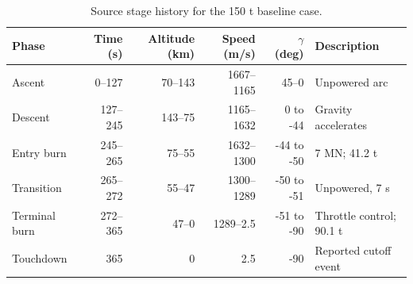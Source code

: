\begin{table}[htbp]
\caption{Source stage history for the 150 t baseline case.}
\label{tab:src6}
\small
\setlength{\tabcolsep}{3.5pt}
\begin{tabularx}{\linewidth}{@{}p{.16\linewidth}rrrrX@{}}
\toprule
Phase & Time (s) & Altitude (km) & Speed (m/s) & $\gamma$ (deg) & Description \\
\midrule
Ascent & 0--127 & 70--143 & 1667--1165 & 45--0 & Unpowered arc \\
Descent & 127--245 & 143--75 & 1165--1632 & 0 to -44 & Gravity accelerates \\
Entry burn & 245--265 & 75--55 & 1632--1300 & -44 to -50 & 7 MN; 41.2 t \\
Transition & 265--272 & 55--47 & 1300--1289 & -50 to -51 & Unpowered, 7 s \\
Terminal burn & 272--365 & 47--0 & 1289--2.5 & -51 to -90 & Throttle control; 90.1 t \\
Touchdown & 365 & 0 & 2.5 & -90 & Reported cutoff event \\
\bottomrule
\end{tabularx}
\end{table}
